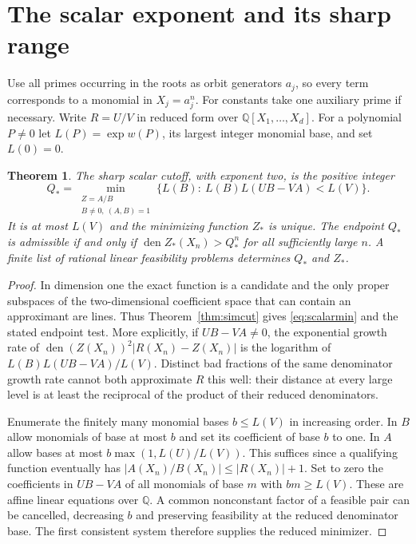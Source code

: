 \documentclass[11pt,a4paper,reqno]{amsart}
\newtheorem{theorem}{Theorem}[section]
\theoremstyle{definition}
\theoremstyle{remark}
\numberwithin{equation}{section}
\begin{document}
\section{The scalar exponent and its sharp range}\label{sec:scalar}
Use all primes occurring in the roots as orbit generators \(a_j\), so every term corresponds to a monomial in \(X_j=a_j^n\). For constants take one auxiliary prime if necessary. Write \(R=U/V\) in reduced form over \(\mathbb Q[X_1,\ldots,X_d]\). For a polynomial \(P\ne0\) let \(L(P)=\exp w(P)\), its largest integer monomial base, and set \(L(0)=0\).
\begin{theorem}\label{thm:scalarcut}
The sharp scalar cutoff, with exponent two, is the positive integer
\begin{equation}\label{eq:scalarmin}
   Q_*=\min_{\substack{Z=A/B\\ B\ne0,\ (A,B)=1}}
      \{L(B):\ L(B)L(UB-VA)<L(V)\}.
\end{equation}
It is at most \(L(V)\) and the minimizing function \(Z_*\) is unique. The endpoint \(Q_*\) is admissible if and only if \(\operatorname{den}Z_*(X_n)>Q_*^n\) for all sufficiently large \(n\). A finite list of rational linear feasibility problems determines \(Q_*\) and \(Z_*\).
\end{theorem}
\begin{proof}
In dimension one the exact function is a candidate and the only proper subspaces of the two-dimensional coefficient space that can contain an approximant are lines. Thus Theorem~\ref{thm:simcut} gives \eqref{eq:scalarmin} and the stated endpoint test. More explicitly, if \(UB-VA\ne0\), the exponential growth rate of
\(\operatorname{den}(Z(X_n))^2|R(X_n)-Z(X_n)|\)
is the logarithm of \(L(B)L(UB-VA)/L(V)\). Distinct bad fractions of the same denominator growth rate cannot both approximate \(R\) this well: their distance at every large level is at least the reciprocal of the product of their reduced denominators.

Enumerate the finitely many monomial bases \(b\le L(V)\) in increasing order. In \(B\) allow monomials of base at most \(b\) and set its coefficient of base \(b\) to one. In \(A\) allow bases at most \(b\max(1,L(U)/L(V))\). This suffices since a qualifying function eventually has \(|A(X_n)/B(X_n)|\le |R(X_n)|+1\). Set to zero the coefficients in \(UB-VA\) of all monomials of base \(m\) with \(bm\ge L(V)\). These are affine linear equations over \(\mathbb Q\). A common nonconstant factor of a feasible pair can be cancelled, decreasing \(b\) and preserving feasibility at the reduced denominator base. The first consistent system therefore supplies the reduced minimizer.
\end{proof}
\end{document}
